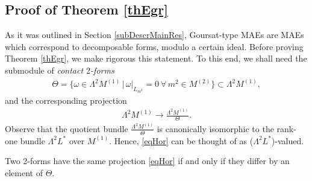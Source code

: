 \documentclass[pdftex]{sigma}
\numberwithin{equation}{section}
\begin{document}
\subsection{Proof of Theorem \ref{thEgr}}\label{subProofThEgr}

As it was outlined in Section \ref{subDescrMainRes}, Goursat-type MAEs are MAEs which correspond to decomposable forms, modulo a certain ideal. Before proving Theorem \ref{thEgr}, we make rigorous this statement. To this end, we shall need the submodule of \emph{contact $2$-forms}
\begin{gather}\label{defThetaGrande}
\Theta=\big\{\omega\in \Lambda^2 M^{(1)}\,|\,\omega|_{L_{m^2}}=0\ \forall\, m^2\in M^{(2)}\big\} \subset\Lambda^2 M^{(1)},
\end{gather}
and the corresponding projection
\begin{gather}\label{eqHor}
\Lambda^2 M^{(1)}\longrightarrow \frac{\Lambda^2 M^{(1)}}{\Theta}.
\end{gather}
Observe that the quotient bundle $ \frac{\Lambda^2 M^{(1)}}{\Theta}$ is canonically isomorphic to the rank-one bundle $\Lambda^2L^\ast$ over $M^{(1)}$. Hence, \eqref{eqHor} can be thought of as ($\Lambda^2L^\ast$)-valued.
\begin{Remark}\label{remarcoCheEraAddiritturaUnTheorema}
Two 2-forms have the same projection \eqref{eqHor} if and only if they dif\/fer by an element of $\Theta$.
\end{Remark}
\end{document}
